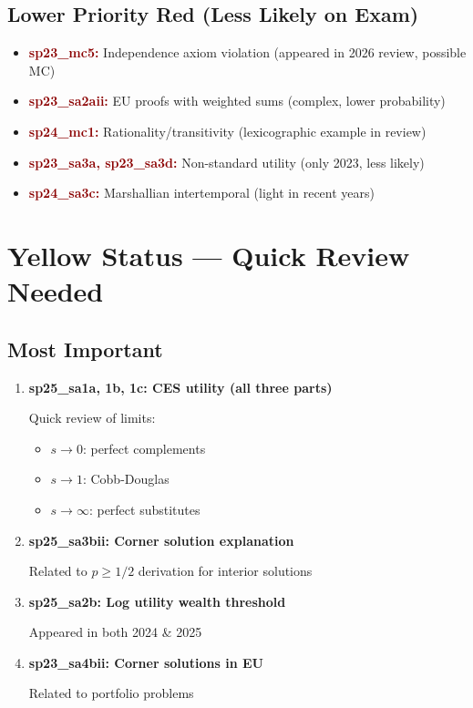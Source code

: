 \documentclass[11pt]{article}
\newcommand{\yellow}[1]{\textcolor{darkyellow}{\textbf{#1}}}
\newcommand{\red}[1]{\textcolor{darkred}{\textbf{#1}}}
\begin{document}
\subsection*{Lower Priority Red (Less Likely on Exam)}

\begin{itemize}[leftmargin=*]
    \item \red{sp23\_mc5:} Independence axiom violation (appeared in 2026 review, possible MC)
    \item \red{sp23\_sa2aii:} EU proofs with weighted sums (complex, lower probability)
    \item \red{sp24\_mc1:} Rationality/transitivity (lexicographic example in review)
    \item \red{sp23\_sa3a, sp23\_sa3d:} Non-standard utility (only 2023, less likely)
    \item \red{sp24\_sa3c:} Marshallian intertemporal (light in recent years)
\end{itemize}

\section{\yellow{Yellow Status --- Quick Review Needed}}

\subsection*{Most Important}

\begin{enumerate}[leftmargin=*]
    \item \yellow{sp25\_sa1a, 1b, 1c: CES utility (all three parts)}

    Quick review of limits:
    \begin{itemize}
        \item $s \to 0$: perfect complements
        \item $s \to 1$: Cobb-Douglas
        \item $s \to \infty$: perfect substitutes
    \end{itemize}

    \item \yellow{sp25\_sa3bii: Corner solution explanation}

    Related to $p \geq 1/2$ derivation for interior solutions

    \item \yellow{sp25\_sa2b: Log utility wealth threshold}

    Appeared in both 2024 \& 2025

    \item \yellow{sp23\_sa4bii: Corner solutions in EU}

    Related to portfolio problems
\end{enumerate}
\end{document}
